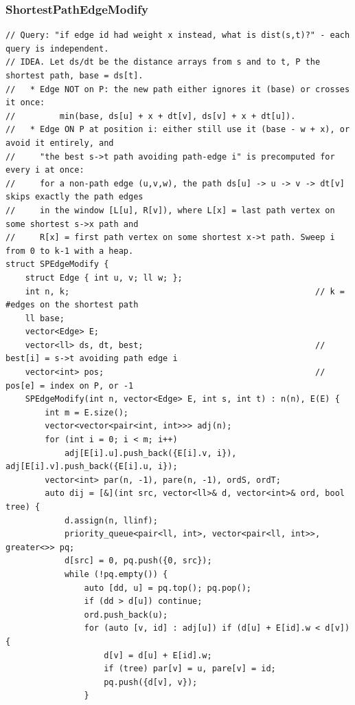 \documentclass[9pt,a4paper,twocolumn]{extarticle}
\begin{document}
\subsubsection{ShortestPathEdgeModify}
\nopagebreak
\begin{lstlisting}
// Query: "if edge id had weight x instead, what is dist(s,t)?" - each query is independent.
// IDEA. Let ds/dt be the distance arrays from s and to t, P the shortest path, base = ds[t].
//   * Edge NOT on P: the new path either ignores it (base) or crosses it once:
//         min(base, ds[u] + x + dt[v], ds[v] + x + dt[u]).
//   * Edge ON P at position i: either still use it (base - w + x), or avoid it entirely, and
//     "the best s->t path avoiding path-edge i" is precomputed for every i at once:
//     for a non-path edge (u,v,w), the path ds[u] -> u -> v -> dt[v] skips exactly the path edges
//     in the window [L[u], R[v]), where L[x] = last path vertex on some shortest s->x path and
//     R[x] = first path vertex on some shortest x->t path. Sweep i from 0 to k-1 with a heap.
struct SPEdgeModify {
    struct Edge { int u, v; ll w; };
    int n, k;                                                  // k = #edges on the shortest path
    ll base;
    vector<Edge> E;
    vector<ll> ds, dt, best;                                   // best[i] = s->t avoiding path edge i
    vector<int> pos;                                           // pos[e] = index on P, or -1
    SPEdgeModify(int n, vector<Edge> E, int s, int t) : n(n), E(E) {
        int m = E.size();
        vector<vector<pair<int, int>>> adj(n);
        for (int i = 0; i < m; i++)
            adj[E[i].u].push_back({E[i].v, i}), adj[E[i].v].push_back({E[i].u, i});
        vector<int> par(n, -1), pare(n, -1), ordS, ordT;
        auto dij = [&](int src, vector<ll>& d, vector<int>& ord, bool tree) {
            d.assign(n, llinf);
            priority_queue<pair<ll, int>, vector<pair<ll, int>>, greater<>> pq;
            d[src] = 0, pq.push({0, src});
            while (!pq.empty()) {
                auto [dd, u] = pq.top(); pq.pop();
                if (dd > d[u]) continue;
                ord.push_back(u);
                for (auto [v, id] : adj[u]) if (d[u] + E[id].w < d[v]) {
                    d[v] = d[u] + E[id].w;
                    if (tree) par[v] = u, pare[v] = id;
                    pq.push({d[v], v});
                }

\end{lstlisting}
\end{document}
